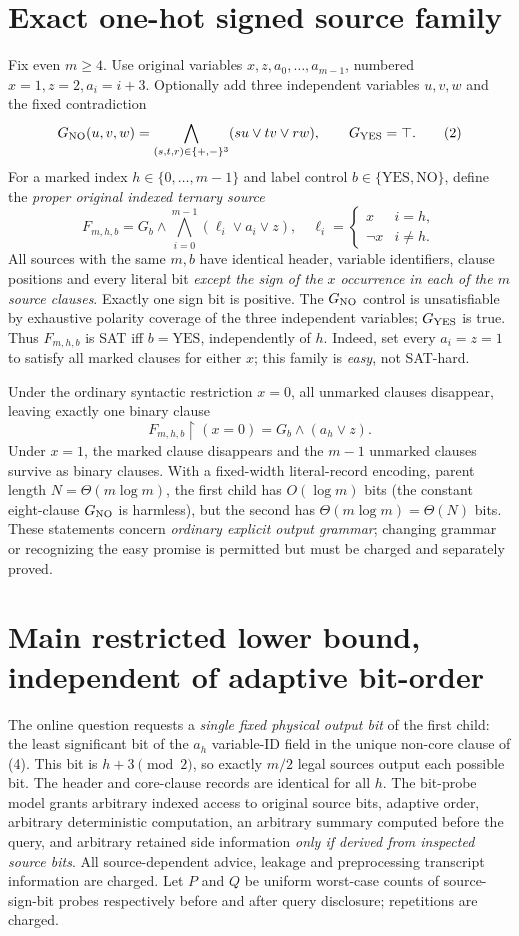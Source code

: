 \documentclass[10pt]{article}
\begin{document}
\section{Exact one-hot signed source family}
Fix even $m\ge4$. Use original variables $x,z,a_0,\ldots,a_{m-1}$, numbered $x=1,z=2,a_i=i+3$. Optionally add three independent variables $u,v,w$ and the fixed contradiction
\[
G_{\rm NO}(u,v,w)=\bigwedge_{(s,t,r)\in\{+,-\}^3}
(su\vee tv\vee rw),\qquad G_{\rm YES}=\top.
\tag{2}
\]
For a marked index $h\in\{0,\ldots,m-1\}$ and label control $b\in\{\mathrm{YES},\mathrm{NO}\}$, define the \emph{proper original indexed ternary source}
\[
 F_{m,h,b}=G_b\wedge\bigwedge_{i=0}^{m-1}
 (\ell_i\vee a_i\vee z),\quad
 \ell_i=\begin{cases}x&i=h,\\\neg x&i\ne h.\end{cases}
\tag{3}
\]
All sources with the same $m,b$ have identical header, variable identifiers, clause positions and every literal bit \emph{except the sign of the $x$ occurrence in each of the $m$ source clauses}. Exactly one sign bit is positive. The $G_{\rm NO}$ control is unsatisfiable by exhaustive polarity coverage of the three independent variables; $G_{\rm YES}$ is true. Thus $F_{m,h,b}$ is SAT iff $b=\mathrm{YES}$, independently of $h$. Indeed, set every $a_i=z=1$ to satisfy all marked clauses for either $x$; this family is \emph{easy}, not SAT-hard.

Under the ordinary syntactic restriction $x=0$, all unmarked clauses disappear, leaving exactly one binary clause
\[
 F_{m,h,b}\restriction(x=0)=G_b\wedge(a_h\vee z).
\tag{4}
\]
Under $x=1$, the marked clause disappears and the $m-1$ unmarked clauses survive as binary clauses. With a fixed-width literal-record encoding, parent length $N=\Theta(m\log m)$, the first child has $O(\log m)$ bits (the constant eight-clause $G_{\rm NO}$ is harmless), but the second has $\Theta(m\log m)=\Theta(N)$ bits. These statements concern \emph{ordinary explicit output grammar}; changing grammar or recognizing the easy promise is permitted but must be charged and separately proved.

\section{Main restricted lower bound, independent of adaptive bit-order}
The online question requests a \emph{single fixed physical output bit} of the first child: the least significant bit of the $a_h$ variable-ID field in the unique non-core clause of (4). This bit is $h+3\pmod2$, so exactly $m/2$ legal sources output each possible bit. The header and core-clause records are identical for all $h$. The bit-probe model grants arbitrary indexed access to original source bits, adaptive order, arbitrary deterministic computation, an arbitrary summary computed before the query, and arbitrary retained side information \emph{only if derived from inspected source bits}. All source-dependent advice, leakage and preprocessing transcript information are charged. Let $P$ and $Q$ be uniform worst-case counts of source-sign-bit probes respectively before and after query disclosure; repetitions are charged.
\end{document}
